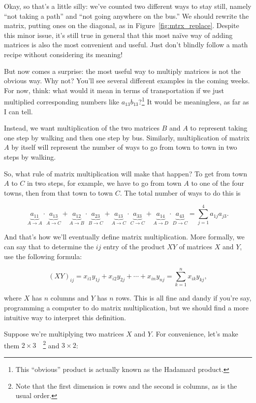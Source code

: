 \documentclass[../gatm.tex]{subfiles}
\begin{document}
\noindent Okay, so that's a little silly: we've counted two different ways to stay still, namely ``not taking a path'' and ``not going anywhere on the bus.'' We should rewrite the matrix, putting ones on the diagonal, as in Figure~\ref{fig:mtrx_replace}. Despite this minor issue, it's still true in general that this most naïve way of adding matrices is also the most convenient and useful. Just don't blindly follow a math recipe without considering its meaning!

But now comes a surprise: the most useful way to multiply matrices is not the obvious way. Why not? You'll see several different examples in the coming weeks. For now, think: what would it mean in terms of transportation if we just multiplied corresponding numbers like $a_{13}b_{13}$?\footnote{This ``obvious'' product is actually known as the Hadamard product.} It would be meaningless, as far as I can tell.

Instead, we want multiplication of the two matrices $B$ and $A$ to represent taking one step by walking and then one step by bus. Similarly, multiplication of matrix $A$ by itself will represent the number of ways to go from town to town in two steps by walking.

So, what rule of matrix multiplication will make that happen? To get from town $A$ to $C$ in two steps, for example, we have to go from town $A$ to one of the four towns, then from that town to town $C$. The total number of ways to do this is

$$\underbrace{a_{11}}_{A\to A}\cdot \underbrace{a_{13}}_{A\to C}+\underbrace{a_{12}}_{A\to B}\cdot \underbrace{a_{23}}_{B\to C}+\underbrace{a_{13}}_{A\to C}\cdot \underbrace{a_{33}}_{C\to C}+\underbrace{a_{14}}_{A\to D}\cdot \underbrace{a_{43}}_{D\to C}=\sum_{j=1}^{4}a_{1j}a_{j3}.$$

\noindent And that's how we'll eventually define matrix multiplication. More formally, we can say that to determine the $ij$ entry of the product $XY$ of matrices $X$ and $Y$, use the following formula:

$$(XY)_{ij}=x_{i1}y_{1j}+x_{i2}y_{2j}+\cdots + x_{in}y_{nj} = \sum_{k=1}^n x_{ik} y_{kj},$$

\noindent where $X$ has $n$ columns and $Y$ has $n$ rows. This is all fine and dandy if you're say, programming a computer to do matrix multiplication, but we should find a more intuitive way to interpret this definition.

Suppose we're multiplying two matrices $X$ and $Y$. For convenience, let's make them $2\times 3\quad$\footnote{Note that the first dimension is rows and the second is columns, as is the usual order.} and $3\times 2$:
\end{document}
